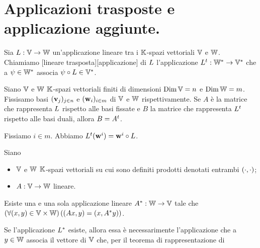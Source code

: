 \section{Applicazioni trasposte e applicazione aggiunte.}
\label{GeometriaLineare_ApplicazioniTrasposteEApplicazioniAggiunte}
\begin{Definition}
	Sia
  $L: \mathbb{V} \rightarrow \mathbb{W}$
  un'applicazione lineare tra i $\mathbb{K}$-spazi vettoriali
  $\mathbb{V}$ e $\mathbb{W}$.
  Chiamiamo
  [lineare trasposta][applicazione] di
  $L$ l'applicazione
  ${L}^t: {{\mathbb{W}}^*} \rightarrow {{\mathbb{V}}^*}$
  che a $\psi \in {{\mathbb{W}}^*}$ associa
  $\psi \circ L \in {{\mathbb{V}}^*}$.
\end{Definition}
\begin{Theorem}
	Siano $\mathbb{V}$ e $\mathbb{W}$ $\mathbb{K}$-spazi vettoriali finiti
  di dimensioni
  $\operatorname{\operatorname{Dim}}{\mathbb{V}} = n$
  e
  $\operatorname{\operatorname{Dim}}{\mathbb{W}} = m$.
  Fissisamo basi
  $(\mathbf{v}_j)_{j \in n}$
  e
  $(\mathbf{w}_i)_{i \in m}$
  di $\mathbb{V}$ e $\mathbb{W}$ rispettivamente.
  Se $A$ \`e la matrice che rappresenta $L$ rispetto alle basi fissate e
  $B$ la matrice che rappresenta ${L}^t$ rispetto alle basi
  duali, allora $B = {A}^t$.
\end{Theorem}
\Proof Fissiamo $i \in m$. Abbiamo
  ${L}^t(\mathbf{w}^i) = \mathbf{w}^i \circ L$.
\begin{Theorem}
	Siano
	\begin{itemize}
		\item $\mathbb{V}$ e $\mathbb{W}$ $\mathbb{K}$-spazi vettoriali su cui
          sono definiti prodotti denotati entrambi
          $\left ( \cdot , \cdot \right )$;
		\item $A: \mathbb{V} \rightarrow \mathbb{W}$ lineare.
	\end{itemize}
	Esiste una e una sola applicazione lineare
  ${A}^*: \mathbb{W} \rightarrow \mathbb{V}$ tale che
  $\left ( \forall (x,y) \in \mathbb{V} \times \mathbb{W} \right ) \left ( \left ( A x , y \right )
      = \left ( x , {A}^* y \right ) \right )$.
\end{Theorem}
\Proof Se l'applicazione ${L}^*$ esiste,
allora essa \`e necessarimente l'applicazione che a $y \in \mathbb{W}$
associa il vettore di $\mathbb{V}$ che, per il teorema di rappresentazione di
